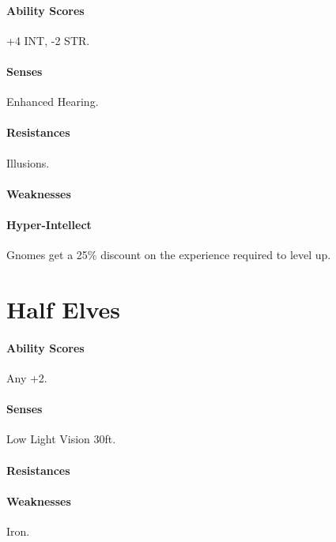 \begin{multicols}{2}
    \paragraph{Ability Scores} +4 INT, -2 STR.
    \paragraph{Senses} Enhanced Hearing. 
    \paragraph{Resistances} Illusions.
    \paragraph{Weaknesses} 
    
    \paragraph{Hyper-Intellect} Gnomes get a 25\% discount on the experience required to level up. 

\section{Half Elves} 


    \paragraph{Ability Scores} Any +2. 
    \paragraph{Senses} Low Light Vision 30ft.
    \paragraph{Resistances} 
    \paragraph{Weaknesses} Iron.
    

\end{multicols}
